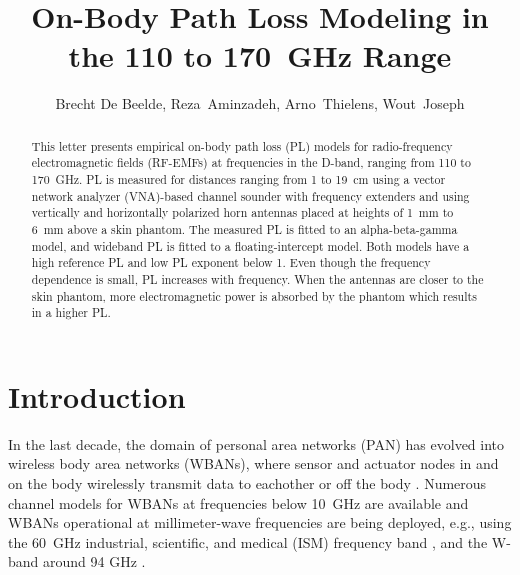 \documentclass[preprint]{rsl}
\title{On-Body Path Loss Modeling in the 110 to 170~GHz Range}
\author{Brecht De Beelde,
Reza~Aminzadeh,
Arno~Thielens,
Wout~Joseph
}
\begin{document}
\maketitle

%
%

\begin{abstract}
This letter presents empirical on-body path loss (PL) models for radio-frequency electromagnetic fields (RF-EMFs) at frequencies in the D-band, ranging from 110 to 170~GHz. 
PL is measured for distances ranging from 1 to 19~cm using a vector network analyzer (VNA)-based channel sounder with frequency extenders and using vertically and horizontally polarized horn antennas placed at heights of 1~mm to 6~mm above a skin phantom.
The measured PL is fitted to an alpha-beta-gamma model, and wideband PL is fitted to a floating-intercept model.
Both models have a high reference PL and low PL exponent below 1. 
Even though the frequency dependence is small, PL increases with frequency. 
When the antennas are closer to the skin phantom, more electromagnetic power is absorbed by the phantom which results in a higher PL.
\end{abstract}

\section{Introduction\label{sect:intro}}

In the last decade, the domain of personal area networks (PAN) has evolved into wireless body area networks (WBANs), where sensor and actuator nodes in and on the body  wirelessly transmit data to eachother \cite{Patel2010,Reusens2009} or off the body \cite{Marinova2015}. 
Numerous channel models for WBANs at frequencies below 10~GHz are available \cite{VanRoy2010,Qaraqe2014} and WBANs operational at millimeter-wave frequencies are being deployed, e.g., using the 60~GHz industrial, scientific, and medical (ISM) frequency band \cite{Chahat2013,Petrillo2014,Aminzadeh2021_tap}, and the W-band around 94 GHz \cite{Brizzi2013,Ali2022}.
\end{document}

